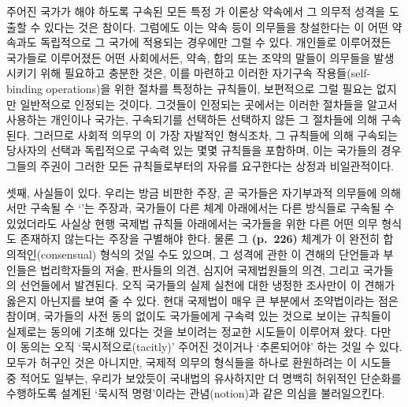 주어진 국가가 해야 하도록 구속된 모든 특정 가 이론상
약속에서 그 의무적 성격을 도출할 수 있다는 것은 참이다. 그럼에도 이는
약속 등이 의무들을 창설한다는 이 어떤 약속과도 독립적으로 그
국가에 적용되는 경우에만 그럴 수 있다. 개인들로 이루어졌든 국가들로
이루어졌든 어떤 사회에서든, 약속, 합의 또는 조약의 말들이 의무들을
발생시키기 위해 필요하고 충분한 것은, 이를 마련하고 이러한 자기구속
작용들(self-binding operations)을 위한 절차를 특정하는 규칙들이,
보편적으로 그럴 필요는 없지만 일반적으로 인정되는 것이다. 그것들이
인정되는 곳에서는 이러한 절차들을 알고서 사용하는 개인이나 국가는,
구속되기를 선택하든 선택하지 않든 그 절차들에 의해 구속된다. 그러므로
사회적 의무의 이 가장 자발적인 형식조차, 그 규칙들에 의해 구속되는
당사자의 선택과 독립적으로 구속력 있는 몇몇 규칙들을 포함하며, 이는
국가들의 경우 그들의 주권이 그러한 모든 규칙들로부터의 자유를 요구한다는
상정과 비일관적이다.

셋째, 사실들이 있다. 우리는 방금 비판한  주장, 곧 국가들은
자기부과적 의무들에 의해서만 구속될 수 ‘’는 주장과, 국가들이
다른 체계 아래에서는 다른 방식들로 구속될 수 있었더라도 사실상 현행
국제법 규칙들 아래에서는 국가들을 위한 다른 어떤 의무 형식도 존재하지
않는다는 주장을 구별해야 한다. 물론 그 \textbf{(p.~226)} 체계가 이
완전히 합의적인(consensual) 형식의 것일 수도 있으며, 그 성격에 관한 이
견해의 단언들과 부인들은 법리학자들의 저술, 판사들의 의견, 심지어
국제법원들의 의견, 그리고 국가들의 선언들에서 발견된다. 오직 국가들의
실제 실천에 대한 냉정한 조사만이 이 견해가 옳은지 아닌지를 보여 줄 수
있다. 현대 국제법이 매우 큰 부분에서 조약법이라는 점은 참이며, 국가들의
사전 동의 없이도 국가들에게 구속력 있는 것으로 보이는 규칙들이 실제로는
동의에 기초해 있다는 것을 보이려는 정교한 시도들이 이루어져 왔다. 다만
이 동의는 오직 ‘묵시적으로(tacitly)’ 주어진 것이거나 ‘추론되어야’ 하는
것일 수 있다. 모두가 허구인 것은 아니지만, 국제적 의무의 형식들을 하나로
환원하려는 이 시도들 중 적어도 일부는, 우리가 보았듯이 국내법의
유사하지만 더 명백히 허위적인 단순화를 수행하도록 설계된 ‘묵시적
명령’이라는 관념(notion)과 같은 의심을 불러일으킨다.

